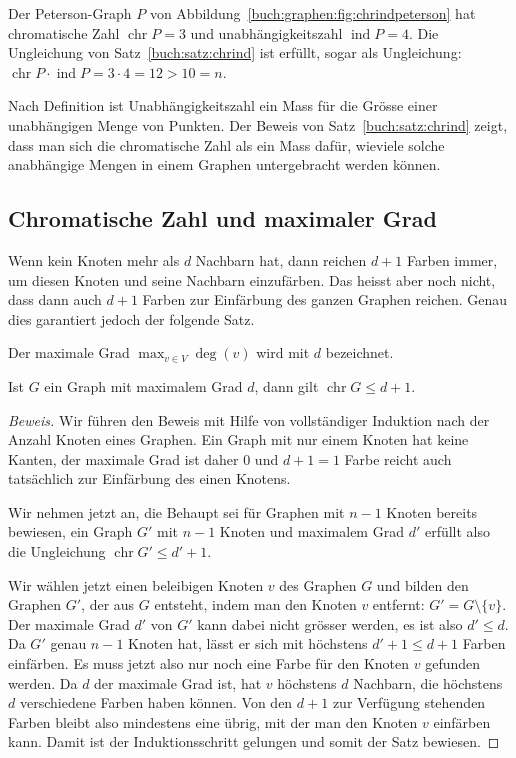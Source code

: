 \begin{beispiel}
Der Peterson-Graph $P$ von Abbildung~\ref{buch:graphen:fig:chrindpeterson}
hat chromatische Zahl $\operatorname{chr}P=3$ und unabhängigkeitszahl
$\operatorname{ind}P=4$.
Die Ungleichung von Satz~\ref{buch:satz:chrind} ist erfüllt, sogar als
Ungleichung: $\operatorname{chr}P\cdot\operatorname{ind}P=3\cdot 4=12>10=n$.
\end{beispiel}

Nach Definition ist Unabhängigkeitszahl ein Mass für die Grösse einer
unabhängigen Menge von Punkten.
Der Beweis von Satz~\ref{buch:satz:chrind} zeigt, dass man sich die
chromatische Zahl als ein Mass dafür, wieviele solche anabhängige 
Mengen in einem Graphen untergebracht werden können.

%
%
\subsection{Chromatische Zahl und maximaler Grad
\label{buch:subsection:chr-und-maximaler-grad}}
Wenn kein Knoten mehr als $d$ Nachbarn hat, dann reichen
$d+1$ Farben immer, um diesen Knoten und seine Nachbarn einzufärben.
Das heisst aber noch nicht, dass dann auch $d+1$ Farben zur
Einfärbung des ganzen Graphen reichen.
Genau dies garantiert jedoch der folgende Satz.

\begin{definition}
Der maximale Grad
\(
\max_{v\in V} \deg(v)
\)
wird mit $d$ bezeichnet.
\end{definition}

\begin{satz}
\label{buch:graphen:satz:chrmaxgrad}
Ist $G$ ein Graph mit maximalem Grad $d$, dann gilt 
$\operatorname{chr}G \le d+1$.
\end{satz}

\begin{proof}[Beweis]
Wir führen den Beweis mit Hilfe von vollständiger Induktion nach der
Anzahl Knoten eines Graphen.
Ein Graph mit nur einem Knoten hat keine Kanten, der maximale Grad ist
daher $0$ und $d+1=1$ Farbe reicht auch tatsächlich zur Einfärbung des
einen Knotens.

Wir nehmen jetzt an, die Behaupt sei für Graphen mit $n-1$ Knoten bereits
bewiesen, ein Graph $G'$ mit $n-1$ Knoten und maximalem Grad $d'$ erfüllt
also die Ungleichung $\operatorname{chr}G'\le d'+1$.

Wir wählen jetzt einen beleibigen Knoten $v$ des Graphen $G$ und bilden
den Graphen $G'$, der aus $G$ entsteht, indem man den Knoten $v$
entfernt: $G'=G\setminus\{v\}$.
Der maximale Grad $d'$ von $G'$ kann dabei nicht grösser werden, es ist
also $d'\le d$.
Da $G'$ genau $n-1$ Knoten hat, lässt er sich mit höchstens $d'+1\le d+1$
Farben einfärben.
Es muss jetzt also nur noch eine Farbe für den Knoten $v$ gefunden werden.
Da $d$ der maximale Grad ist, hat $v$ höchstens $d$ Nachbarn, die höchstens
$d$ verschiedene Farben haben können.
Von den $d+1$ zur Verfügung stehenden Farben bleibt also mindestens eine
übrig, mit der man den Knoten $v$ einfärben kann.
Damit ist der Induktionsschritt gelungen und somit der Satz bewiesen.
\end{proof}

